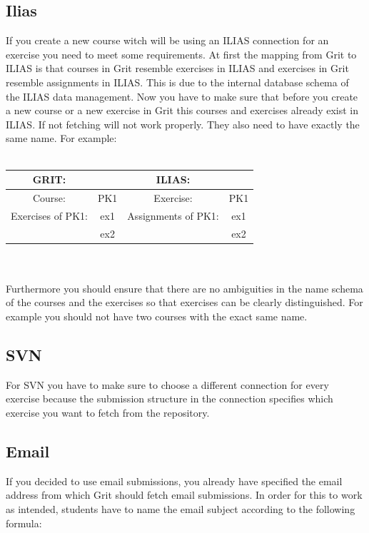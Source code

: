 \documentclass[10pt,a4paper, titlepage, toc=idx]{scrreprt}
\theoremstyle{definition}
\theoremstyle{plain}
\newcommand*{\product}{Grit}
\begin{document}
       \subsection{Ilias}
       If you create a new course witch will be using an ILIAS connection for an exercise you need to meet some requirements. At first the mapping from \product{} to ILIAS is that courses in \product{} resemble exercises in ILIAS and exercises in \product{} resemble assignments in ILIAS. This is due to the internal database schema of the ILIAS data management. Now you have to make sure that before you create a new course or a new exercise in \product{} this courses and exercises already exist in ILIAS. If not fetching will not work properly. They also need to have exactly the same name. For example:\\\\
	    \begin{tabular}{c c | c c}
	    GRIT: 				&		& ILIAS:				& \\\hline
	    Course: 			&PK1	& Exercise: 			&PK1\\
	    Exercises of PK1:	&ex1	& Assignments of PK1:	& ex1\\
	    					&ex2	&						& ex2
\end{tabular}	 \\\\
Furthermore you should ensure that there are no ambiguities in the name schema of the courses and the exercises so that exercises can be clearly distinguished. For example you should not have two courses with the exact same name.
  	
       \subsection{SVN}
       For SVN you have to make sure to choose a different connection
       for every exercise because the submission structure in the
       connection specifies which exercise you want to fetch from the
       repository.

       \subsection{Email}
       If you decided to use email submissions, you already have
       specified the email address from which \product{} should fetch
       email submissions. In order for this to work as intended,
       students have to name the email subject according to the
       following formula:
\end{document}
